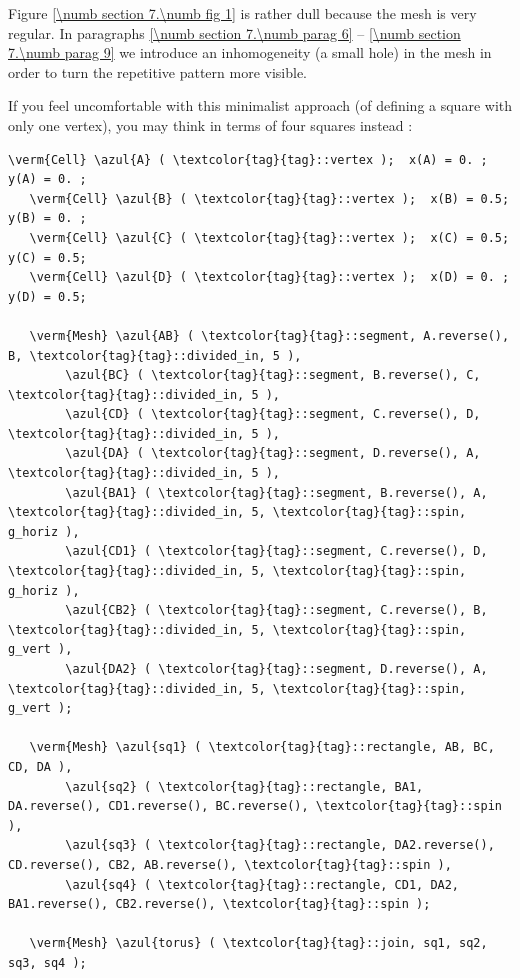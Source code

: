 Figure \ref{\numb section 7.\numb fig 1} is rather dull because the mesh is very regular.
In paragraphs \ref{\numb section 7.\numb parag 6} -- \ref{\numb section 7.\numb parag 9}
we introduce an inhomogeneity (a small hole) in the mesh in order to turn the repetitive pattern
more visible.

If you feel uncomfortable with this minimalist approach (of defining a square with only one
vertex), you may think in terms of four squares instead :

\begin{Verbatim}[commandchars=\\\{\},formatcom=\small\tt,
   baselinestretch=0.94,framesep=2mm                      ]
   \verm{Cell} \azul{A} ( \textcolor{tag}{tag}::vertex );  x(A) = 0. ;  y(A) = 0. ;
   \verm{Cell} \azul{B} ( \textcolor{tag}{tag}::vertex );  x(B) = 0.5;  y(B) = 0. ;
   \verm{Cell} \azul{C} ( \textcolor{tag}{tag}::vertex );  x(C) = 0.5;  y(C) = 0.5;
   \verm{Cell} \azul{D} ( \textcolor{tag}{tag}::vertex );  x(D) = 0. ;  y(D) = 0.5;
   
   \verm{Mesh} \azul{AB} ( \textcolor{tag}{tag}::segment, A.reverse(), B, \textcolor{tag}{tag}::divided_in, 5 ),
        \azul{BC} ( \textcolor{tag}{tag}::segment, B.reverse(), C, \textcolor{tag}{tag}::divided_in, 5 ),
        \azul{CD} ( \textcolor{tag}{tag}::segment, C.reverse(), D, \textcolor{tag}{tag}::divided_in, 5 ),
        \azul{DA} ( \textcolor{tag}{tag}::segment, D.reverse(), A, \textcolor{tag}{tag}::divided_in, 5 ),
        \azul{BA1} ( \textcolor{tag}{tag}::segment, B.reverse(), A, \textcolor{tag}{tag}::divided_in, 5, \textcolor{tag}{tag}::spin, g_horiz ),
        \azul{CD1} ( \textcolor{tag}{tag}::segment, C.reverse(), D, \textcolor{tag}{tag}::divided_in, 5, \textcolor{tag}{tag}::spin, g_horiz ),
        \azul{CB2} ( \textcolor{tag}{tag}::segment, C.reverse(), B, \textcolor{tag}{tag}::divided_in, 5, \textcolor{tag}{tag}::spin, g_vert ),
        \azul{DA2} ( \textcolor{tag}{tag}::segment, D.reverse(), A, \textcolor{tag}{tag}::divided_in, 5, \textcolor{tag}{tag}::spin, g_vert );

   \verm{Mesh} \azul{sq1} ( \textcolor{tag}{tag}::rectangle, AB, BC, CD, DA ),
        \azul{sq2} ( \textcolor{tag}{tag}::rectangle, BA1, DA.reverse(), CD1.reverse(), BC.reverse(), \textcolor{tag}{tag}::spin ),
        \azul{sq3} ( \textcolor{tag}{tag}::rectangle, DA2.reverse(), CD.reverse(), CB2, AB.reverse(), \textcolor{tag}{tag}::spin ),
        \azul{sq4} ( \textcolor{tag}{tag}::rectangle, CD1, DA2, BA1.reverse(), CB2.reverse(), \textcolor{tag}{tag}::spin );
	
   \verm{Mesh} \azul{torus} ( \textcolor{tag}{tag}::join, sq1, sq2, sq3, sq4 );
\end{Verbatim}


